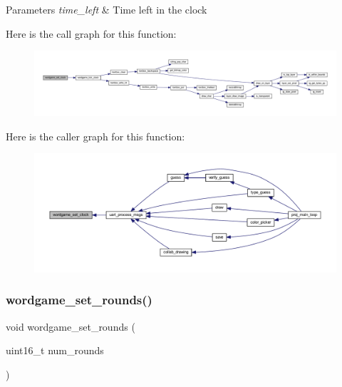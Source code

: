 \begin{DoxyParams}{Parameters}
{\em time\+\_\+left} & Time left in the clock \\
\hline
\end{DoxyParams}
Here is the call graph for this function\+:\nopagebreak
\begin{figure}[H]
\begin{center}
\leavevmode
\includegraphics[width=350pt]{group__wordpicker_ga7984076dba84531d5c4e5e96ca7b177d_cgraph}
\end{center}
\end{figure}
Here is the caller graph for this function\+:\nopagebreak
\begin{figure}[H]
\begin{center}
\leavevmode
\includegraphics[width=350pt]{group__wordpicker_ga7984076dba84531d5c4e5e96ca7b177d_icgraph}
\end{center}
\end{figure}
\mbox{\label{group__wordpicker_ga1a2589aeb050207591f4e9645a352296}} 
\subsubsection{\texorpdfstring{wordgame\+\_\+set\+\_\+rounds()}{wordgame\_set\_rounds()}}
{\footnotesize\ttfamily void wordgame\+\_\+set\+\_\+rounds (\begin{DoxyParamCaption}\item[{uint16\+\_\+t}]{num\+\_\+rounds }\end{DoxyParamCaption})}



